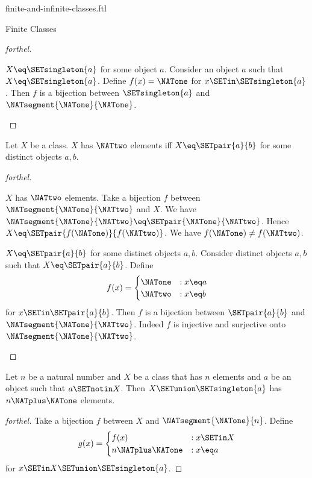 \documentclass{naproche-library}
\begin{document}
\begin{smodule}[title=Finite and Infinite Classes]{finite-and-infinite-classes.ftl}
\begin{sfragment}{Finite Classes}
\begin{proof}[forthel]
    \begin{case}{$X \eq \SETsingleton{a}$ for some object $a$.}
      Consider an object $a$ such that $X \eq \SETsingleton{a}$.
      Define $f(x) = \NATone$ for $x \SETin \SETsingleton{a}$.
      Then $f$ is a bijection between $\SETsingleton{a}$ and $\NATsegment{\NATone}{\NATone}$.
    \end{case}
  \end{proof}

  \begin{proposition}[forthel,id=FOUNDATIONS_14_3468912675458910]
    Let $X$ be a class.
    $X$ has $\NATtwo$ elements iff $X \eq \SETpair{a}{b}$ for some distinct objects $a, b$.
  \end{proposition}
  \begin{proof}[forthel]
    \begin{case}{$X$ has $\NATtwo$ elements.}
      Take a bijection $f$ between $\NATsegment{\NATone}{\NATtwo}$ and $X$.
      We have $\NATsegment{\NATone}{\NATtwo} \eq \SETpair{\NATone}{\NATtwo}$.
      Hence $X \eq \SETpair{f(\NATone)}{f(\NATtwo)}$.
      We have $f(\NATone) \neq f(\NATtwo)$.
    \end{case}

    \begin{case}{$X \eq \SETpair{a}{b}$ for some distinct objects $a, b$.}
      Consider distinct objects $a, b$ such that $X \eq \SETpair{a}{b}$.
      Define \[f(x) =
        \begin{cases}
          \NATone & : x \eq a \\
          \NATtwo & : x \eq b
        \end{cases}\]
      for $x \SETin \SETpair{a}{b}$.
      Then $f$ is a bijection between $\SETpair{a}{b}$ and $\NATsegment{\NATone}{\NATtwo}$.
      Indeed $f$ is injective and surjective onto $\NATsegment{\NATone}{\NATtwo}$.
    \end{case}
  \end{proof}

  \begin{proposition}[forthel,id=FOUNDATIONS_14_0615204230800975]
    Let $n$ be a natural number and $X$ be a class that has $n$ elements and $a$ be an object such that $a \SETnotin X$.
    Then $X \SETunion \SETsingleton{a}$ has $n \NATplus \NATone$ elements.
  \end{proposition}
  \begin{proof}[forthel]
    Take a bijection $f$ between $X$ and $\NATsegment{\NATone}{n}$.
    Define \[g(x) =
      \begin{cases}
        f(x)  & : x \SETin X \\
        n \NATplus \NATone & : x \eq a
      \end{cases}\]
    for $x \SETin X \SETunion \SETsingleton{a}$.


\end{proof}
\end{sfragment}
\end{smodule}
\end{document}
